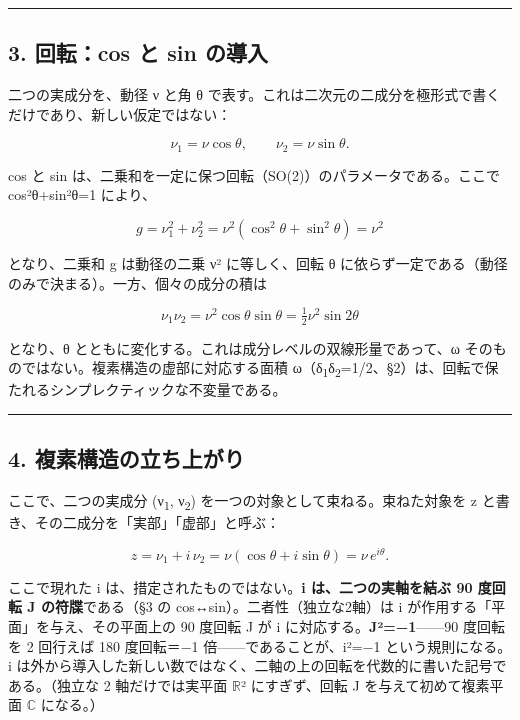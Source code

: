 \documentclass[11pt]{ltjsarticle}
\begin{document}
\begin{center}\rule{0.5\linewidth}{0.5pt}\end{center}

\subsection{3. 回転：cos と sin
の導入}\label{ux56deux8ee2cos-ux3068-sin-ux306eux5c0eux5165}

二つの実成分を、動径 ν と角 θ
で表す。これは二次元の二成分を極形式で書くだけであり、新しい仮定ではない：

\[\nu_1 = \nu\cos\theta, \qquad \nu_2 = \nu\sin\theta.\]

cos と sin は、二乗和を一定に保つ回転（SO(2)）のパラメータである。ここで
cos²θ+sin²θ=1 により、

\[g = \nu_1^2 + \nu_2^2 = \nu^2(\cos^2\theta + \sin^2\theta) = \nu^2\]

となり、二乗和 g は動径の二乗 ν² に等しく、回転 θ
に依らず一定である（動径のみで決まる）。一方、個々の成分の積は

\[\nu_1\nu_2 = \nu^2\cos\theta\sin\theta = \tfrac{1}{2}\nu^2\sin 2\theta\]

となり、θ とともに変化する。これは成分レベルの双線形量であって、ω
そのものではない。複素構造の虚部に対応する面積
ω（δ\textsubscript{1}δ\textsubscript{2}=1/2、§2）は、回転で保たれるシンプレクティックな不変量である。

\begin{center}\rule{0.5\linewidth}{0.5pt}\end{center}

\subsection{4.
複素構造の立ち上がり}\label{ux8907ux7d20ux69cbux9020ux306eux7acbux3061ux4e0aux304cux308a}

ここで、二つの実成分 (ν\textsubscript{1}, ν\textsubscript{2}) を一つの対象として束ねる。束ねた対象を z
と書き、その二成分を「実部」「虚部」と呼ぶ：

\[z = \nu_1 + i\,\nu_2 = \nu(\cos\theta + i\sin\theta) = \nu\,e^{i\theta}.\]

ここで現れた i は、措定されたものではない。\textbf{i
は、二つの実軸を結ぶ 90 度回転 J の符牒}である（§3 の
cos↔sin）。二者性（独立な2軸）は i
が作用する「平面」を与え、その平面上の 90 度回転 J が i
に対応する。\textbf{J²=−1}------90 度回転を 2 回行えば 180 度回転＝−1
倍------であることが、i²=−1 という規則になる。i
は外から導入した新しい数ではなく、二軸の上の回転を代数的に書いた記号である。（独立な
2 軸だけでは実平面 $\mathbb{R}$² にすぎず、回転 J を与えて初めて複素平面 $\mathbb{C}$
になる。）
\end{document}
